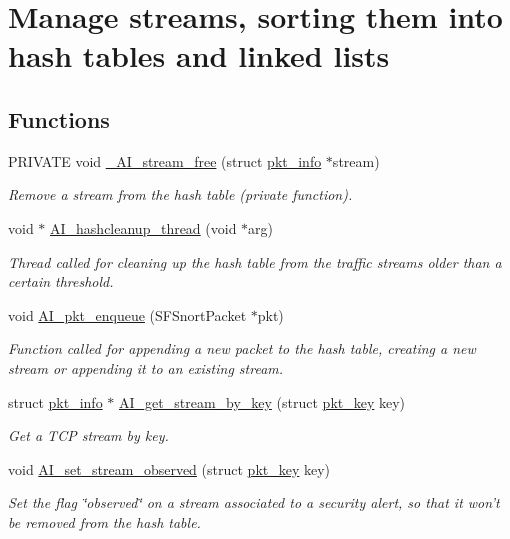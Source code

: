 \hypertarget{group__stream}{
\section{Manage streams, sorting them into hash tables and linked lists}
\label{group__stream}
}
\subsection*{Functions}
\begin{DoxyCompactItemize}
\item 
PRIVATE void \hyperlink{group__stream_ga80016adf701c717a6ebfb5b15b8a5749}{\_\-AI\_\-stream\_\-free} (struct \hyperlink{structpkt__info}{pkt\_\-info} $\ast$stream)
\begin{DoxyCompactList}\small\item\em Remove a stream from the hash table (private function). \item\end{DoxyCompactList}\item 
void $\ast$ \hyperlink{group__stream_ga24b1131374e5059564b8a12380c4eb75}{AI\_\-hashcleanup\_\-thread} (void $\ast$arg)
\begin{DoxyCompactList}\small\item\em Thread called for cleaning up the hash table from the traffic streams older than a certain threshold. \item\end{DoxyCompactList}\item 
void \hyperlink{group__stream_ga7d71c5645b9baff7b6c4b9a181bf80c5}{AI\_\-pkt\_\-enqueue} (SFSnortPacket $\ast$pkt)
\begin{DoxyCompactList}\small\item\em Function called for appending a new packet to the hash table, creating a new stream or appending it to an existing stream. \item\end{DoxyCompactList}\item 
struct \hyperlink{structpkt__info}{pkt\_\-info} $\ast$ \hyperlink{group__stream_ga2efedcabbfd12c5345f0c93a3dd4735c}{AI\_\-get\_\-stream\_\-by\_\-key} (struct \hyperlink{structpkt__key}{pkt\_\-key} key)
\begin{DoxyCompactList}\small\item\em Get a TCP stream by key. \item\end{DoxyCompactList}\item 
void \hyperlink{group__stream_ga8749989cee2ac05a7de058faac280c02}{AI\_\-set\_\-stream\_\-observed} (struct \hyperlink{structpkt__key}{pkt\_\-key} key)
\begin{DoxyCompactList}\small\item\em Set the flag \char`\"{}observed\char`\"{} on a stream associated to a security alert, so that it won't be removed from the hash table. \item\end{DoxyCompactList}\end{DoxyCompactItemize}


